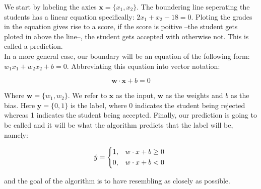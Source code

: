 We start by labeling the axies $\textbf{x} = \{x_{1}, x_{2}\}$. The boundering line seperating the students has a linear equation specifically: $2x_{1} + x_{2} - 18 = 0$. Ploting the grades in the equation gives rise to a score, if the score is poitive --the student gets ploted in above the line--, the student gets accepted with otherwise not. This is called a prediction.\\
In a more general case, our boundary will be an equation of the following form: \mbox{$w_{1}x_{1} + w_{2}x_{2} + b = 0$}.
Abbreviating this equation into vector notation:

\begin{equation}
  \label{linear}
  \textbf{w}\cdot\textbf{x} + b = 0
\end{equation}

Where $\textbf{w} = \{w_{1}, w_{2}\}$. We refer to $\textbf{x}$ as the input, $\textbf{w}$ as the weights and $b$ as the bias. Here $\textbf{y} = \{0, 1\}$ is the label, where 0 indicates the student being rejected whereas 1 indicates the student being accepted. Finally, our prediction is going to be called  and it will be what the algorithm predicts that the label will be, namely:

\begin{equation}
  \label{y_hat}
  \hat{y} =
  \begin{dcases*}
    \text{1,}  &$w\cdot x + b \geq 0$ \\
    \text{0,}  &$w\cdot x + b < 0$
  \end{dcases*}
\end{equation}

and the goal of the algorithm is to have  resembling  as closely as possible. 
